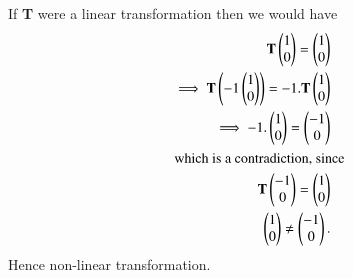  If \textbf{T} were a linear transformation then we would have
 \begin{align}
    \textbf{T}\begin{pmatrix}1 \\0\end{pmatrix} = \begin{pmatrix}1\\0\end{pmatrix}\\ 
  \implies \textbf{T}\left(-1 \begin{pmatrix}1\\ 0\end{pmatrix}\right)  = -1. \textbf{T}\begin{pmatrix}1 \\0\end{pmatrix}\\
   \implies -1. \begin{pmatrix}1 \\ 0 \end{pmatrix} = \begin{pmatrix}-1\\ 0\end{pmatrix} \\
  \intertext{which is a contradiction, since}
   \textbf{T}\begin{pmatrix}-1\\ 0\end{pmatrix} = \begin{pmatrix}1\\0\end{pmatrix}\\  
  \begin{pmatrix}1\\ 0 \end{pmatrix} \neq \begin{pmatrix}-1\\ 0\end{pmatrix}.
\end{align}
  Hence non-linear transformation.

